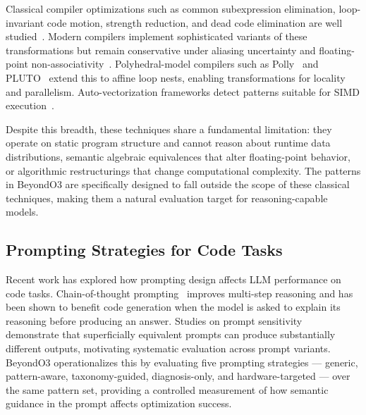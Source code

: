 Classical compiler optimizations such as common subexpression elimination, loop-invariant code motion, strength reduction, and dead code elimination are well studied~\cite{aho2006compilers}. Modern compilers implement sophisticated variants of these transformations but remain conservative under aliasing uncertainty and floating-point non-associativity~\cite{allen2001optimizing}. Polyhedral-model compilers such as Polly~\cite{grosser2012polly} and PLUTO~\cite{bondhugula2008pluto} extend this to affine loop nests, enabling transformations for locality and parallelism. Auto-vectorization frameworks detect patterns suitable for SIMD execution~\cite{nuzman2006auto}.

Despite this breadth, these techniques share a fundamental limitation: they operate on static program structure and cannot reason about runtime data distributions, semantic algebraic equivalences that alter floating-point behavior, or algorithmic restructurings that change computational complexity. The patterns in BeyondO3 are specifically designed to fall outside the scope of these classical techniques, making them a natural evaluation target for reasoning-capable models.

\subsection{Prompting Strategies for Code Tasks}

Recent work has explored how prompting design affects LLM performance on code tasks. Chain-of-thought prompting~\cite{wei2022chain} improves multi-step reasoning and has been shown to benefit code generation when the model is asked to explain its reasoning before producing an answer. Studies on prompt sensitivity~\cite{sclar2023quantifying} demonstrate that superficially equivalent prompts can produce substantially different outputs, motivating systematic evaluation across prompt variants. BeyondO3 operationalizes this by evaluating five prompting strategies --- generic, pattern-aware, taxonomy-guided, diagnosis-only, and hardware-targeted --- over the same pattern set, providing a controlled measurement of how semantic guidance in the prompt affects optimization success.

